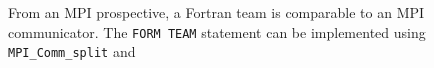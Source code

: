 From an MPI prospective, a Fortran team is comparable to an MPI communicator. The \texttt{FORM TEAM} statement can be
implemented using \texttt{MPI\_Comm\_split} and 








